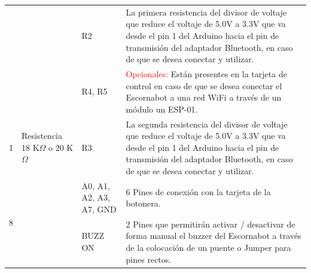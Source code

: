 \documentclass{article}
\begin{document}
\begin{longtable}{|c|>{\raggedright}m{}|>{\centering}m{}|m{}|}
    &  & R2 & La primera resistencia del divisor de voltaje que reduce el voltaje de 5.0V a 3.3V que va desde el pin 1 del Arduino hacia el pin de transmisión del adaptador Bluetooth, en caso de que se desea conectar y utilizar. \\ \cline{3-4}
    &  & R4, R5 & \textcolor{red}{Opcionales:} Están presentes en la tarjeta de control en caso de que se desea conectar el Escornabot a una red WiFi a través de un módulo un ESP-01.  \\ \hline
    1 & Resistencia 18 K$\Omega$ o 20 K$\Omega$ & R3 & La segunda resistencia del divisor de voltaje que reduce el voltaje de 5.0V a 3.3V que va desde el pin 1 del Arduino hacia el pin de transmisión del adaptador Bluetooth, en caso de que se desea conectar y utilizar. \\ \hline
    \multirow{2}{*}{8} & \multirow{2}{0.15\textwidth}{Pines / headers macho rectos} & A0, A1, A2, A3, A7, GND & 6 Pines de conexión con la tarjeta de la botonera. \\ \cline{3-4}
    & & BUZZ ON & 2 Pines que permitirán activar / desactivar de forma manual el buzzer del Escornabot a través de la colocación de un puente o Jumper para pines rectos. \\ \hline
\end{longtable}
\end{document}
